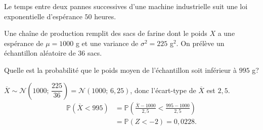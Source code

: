 \begin{questions}

\question[]

Le temps entre deux pannes successives d'une machine industrielle suit une loi exponentielle d'espérance \(50\) heures.


\pagebreak

\question[6]
Une chaîne de production remplit des sacs de farine dont le poids \(X\) a une espérance de \(\mu = 1000\) g et une variance de \(\sigma^2 = 225\) g\(^2\). On prélève un échantillon aléatoire de \(36\) sacs.

Quelle est la probabilité que le poids moyen de l'échantillon soit inférieur à \(995\) g?

\begin{solution}
\(\overline{X}\sim\mathcal{N}\left(1000;\,\dfrac{225}{36}\right) = \mathcal{N}(1000;\,6{,}25)\), donc l'écart-type de \(\overline{X}\) est \(2{,}5\).
\begin{align*}
\mathbb{P}(\overline{X}<995) &= \mathbb{P}\left(\frac{\overline{X}-1000}{2{,}5} < \frac{995-1000}{2{,}5}\right)\\
&= \mathbb{P}(Z<-2) = 0{,}0228.
\end{align*}
\end{solution}




\end{questions}

